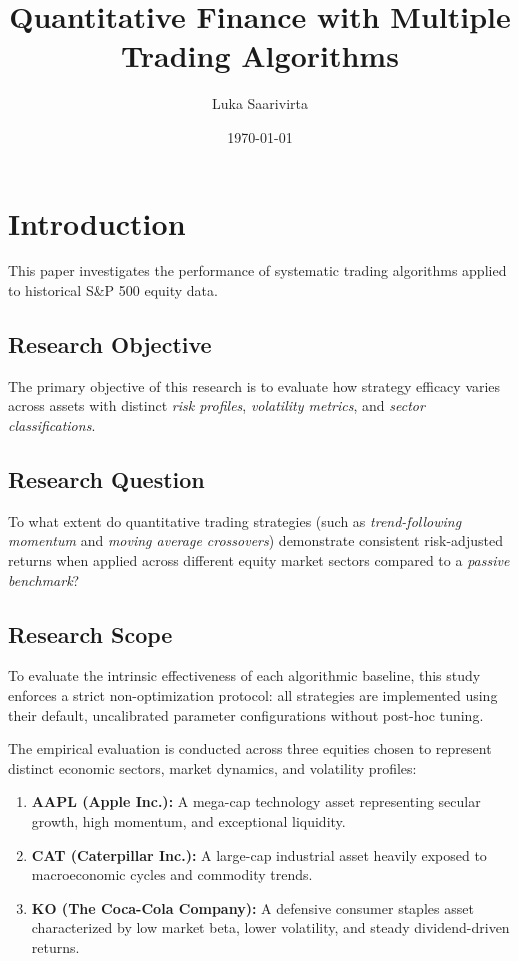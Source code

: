 \documentclass{article}
\title{Quantitative Finance with Multiple Trading Algorithms}
\author{Luka Saarivirta}
\date{\today}
\begin{document}
\maketitle

\tableofcontents

\newpage

\section{Introduction}

This paper investigates the performance of systematic trading algorithms applied to historical S\&P 500 equity data.

\subsection{Research Objective}
The primary objective of this research is to evaluate how strategy efficacy varies across assets with distinct \textit{risk profiles}, \textit{volatility metrics}, and \textit{sector classifications}.

\subsection{Research Question}
To what extent do quantitative trading strategies (such as \textit{trend-following momentum} and \textit{moving average crossovers}) demonstrate consistent risk-adjusted returns when applied across different equity market sectors compared to a \textit{passive benchmark}?

\subsection{Research Scope}
To evaluate the intrinsic effectiveness of each algorithmic baseline, this study enforces a strict non-optimization protocol: all strategies are implemented using their default, uncalibrated parameter configurations without post-hoc tuning.

The empirical evaluation is conducted across three equities chosen to represent distinct economic sectors, market dynamics, and volatility profiles:
\begin{enumerate}
    \item \textbf{AAPL (Apple Inc.):} A mega-cap technology asset representing secular growth, high momentum, and exceptional liquidity.
    \item \textbf{CAT (Caterpillar Inc.):} A large-cap industrial asset heavily exposed to macroeconomic cycles and commodity trends.
    \item \textbf{KO (The Coca-Cola Company):} A defensive consumer staples asset characterized by low market beta, lower volatility, and steady dividend-driven returns.
\end{enumerate}
\end{document}
